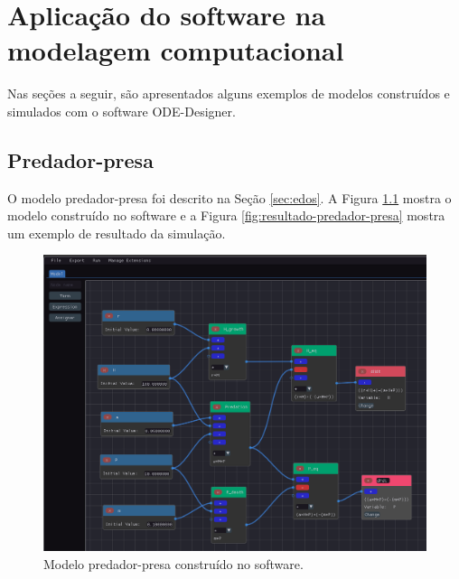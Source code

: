 \documentclass[
	12pt,				%
	openright,			%
	oneside,			%
	a4paper,			%
	main=brazil,
	english,			%
	]{ufsj-abntex2}
\begin{document}
\chapter{Aplicação do software na modelagem computacional}
\label{chap:resultados}


Nas seções a seguir, são apresentados alguns exemplos de modelos construídos e simulados com o software ODE-Designer.

\section{Predador-presa}

O modelo predador-presa foi descrito na Seção \ref{sec:edos}. A Figura \ref{fig:predador-presa} mostra o modelo construído no software e a Figura \ref{fig:resultado-predador-presa} mostra um exemplo de resultado da simulação. 

\begin{figure}[h]
    \centering
    \includegraphics[width=\textwidth]{imgs/modelos/predador-presa.png} 
    \caption{Modelo predador-presa construído no software.}
    \label{fig:predador-presa}
\end{figure}
\end{document}

